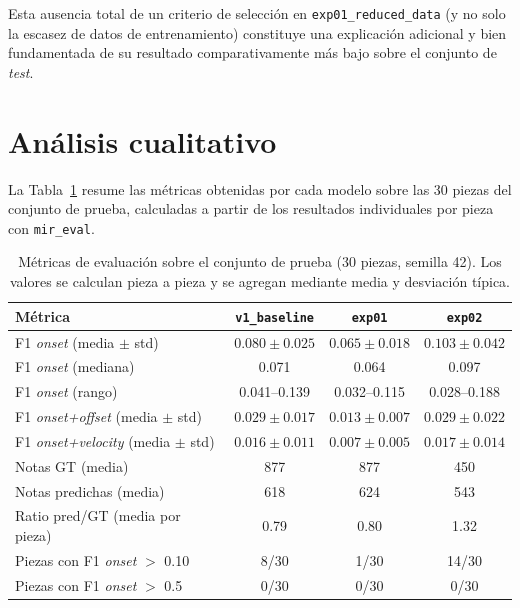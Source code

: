 Esta ausencia total de un criterio de selección en
\texttt{exp01\_reduced\_data} (y no solo la escasez de datos de
entrenamiento) constituye una explicación adicional y bien
fundamentada de su resultado comparativamente más bajo sobre el
conjunto de \textit{test}.

\section{Análisis cualitativo}
\label{sec:analisis_cualitativo}

La Tabla~\ref{tab:resultados_test} resume las métricas obtenidas por
cada modelo sobre las 30 piezas del conjunto de prueba, calculadas a
partir de los resultados individuales por pieza con \texttt{mir\_eval}.

\begin{table}[htbp]
    \centering
    \caption{Métricas de evaluación sobre el conjunto de prueba
    (30 piezas, semilla 42). Los valores se calculan pieza a pieza y
    se agregan mediante media y desviación típica.}
    \label{tab:resultados_test}
    \begin{tabular}{lccc}
        \toprule
        \textbf{Métrica} & \texttt{v1\_baseline} & \texttt{exp01} & \texttt{exp02} \\
        \midrule
        F1 \textit{onset} (media $\pm$ std) & $0.080 \pm 0.025$ & $0.065 \pm 0.018$ & $0.103 \pm 0.042$ \\
        F1 \textit{onset} (mediana) & 0.071 & 0.064 & 0.097 \\
        F1 \textit{onset} (rango) & 0.041--0.139 & 0.032--0.115 & 0.028--0.188 \\
        F1 \textit{onset+offset} (media $\pm$ std) & $0.029 \pm 0.017$ & $0.013 \pm 0.007$ & $0.029 \pm 0.022$ \\
        F1 \textit{onset+velocity} (media $\pm$ std) & $0.016 \pm 0.011$ & $0.007 \pm 0.005$ & $0.017 \pm 0.014$ \\
        Notas GT (media) & 877 & 877 & 450 \\
        Notas predichas (media) & 618 & 624 & 543 \\
        Ratio pred/GT (media por pieza) & 0.79 & 0.80 & 1.32 \\
        Piezas con F1 \textit{onset} $>$ 0.10 & 8/30 & 1/30 & 14/30 \\
        Piezas con F1 \textit{onset} $>$ 0.5 & 0/30 & 0/30 & 0/30 \\
        \bottomrule
    \end{tabular}
\end{table}

